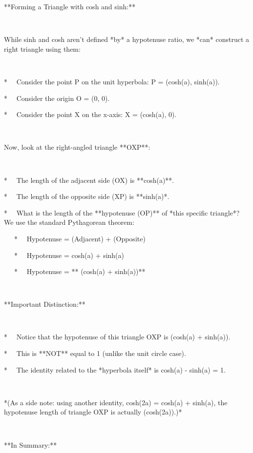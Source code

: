 \documentclass{article}
\newcommand{\nonconverted}[1]{\mbox{}}
\begin{document}
**Forming a Triangle with cosh and sinh:**

\

While sinh and cosh aren't defined *by* a hypotenuse ratio, we *can*
construct a right triangle using them:

\

* \ \ Consider the point P on the unit hyperbola: P = (cosh(a), sinh(a)).

* \ \ Consider the origin O = (0, 0).

* \ \ Consider the point X on the x-axis: X = (cosh(a), 0).

\

Now, look at the right-angled triangle **OXP**:

\

* \ \ The length of the adjacent side (OX) is **cosh(a)**.

* \ \ The length of the opposite side (XP) is **\textbar sinh(a)\textbar **.

* \ \ What is the length of the **hypotenuse (OP)** of *this specific
triangle*? We use the standard Pythagorean theorem:

\ \ \ * \ \ Hypotenuse{\texttwosuperior} = (Adjacent){\texttwosuperior} +
(Opposite){\texttwosuperior}

\ \ \ * \ \ Hypotenuse{\texttwosuperior} = cosh{\texttwosuperior}(a) +
sinh{\texttwosuperior}(a)

\ \ \ * \ \ Hypotenuse = ** \nonconverted{sqrt} (cosh{\texttwosuperior}(a) +
sinh{\texttwosuperior}(a))**

\

**Important Distinction:**

\

* \ \ Notice that the hypotenuse of this triangle OXP is  \nonconverted{sqrt}
(cosh{\texttwosuperior}(a) + sinh{\texttwosuperior}(a)).

* \ \ This is **NOT** equal to 1 (unlike the unit circle case).

* \ \ The identity related to the *hyperbola itself* is
cosh{\texttwosuperior}(a) - sinh{\texttwosuperior}(a) = 1.

\

*(As a side note: using another identity, cosh(2a) =
cosh{\texttwosuperior}(a) + sinh{\texttwosuperior}(a), the hypotenuse length
of triangle OXP is actually  \nonconverted{sqrt} (cosh(2a)).)*

\

**In Summary:**

\
\end{document}
